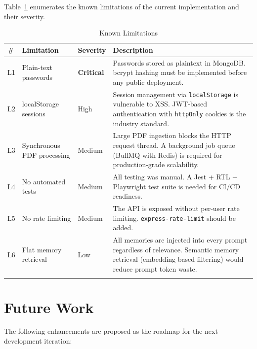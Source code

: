 \documentclass[12pt,a4paper]{report}
\begin{document}
Table~\ref{tab:limitations} enumerates the known limitations of the current implementation and their severity.

\begin{longtable}{@{}p{0.5cm} p{3.8cm} p{2cm} p{6.5cm}@{}}
\toprule
\textbf{\#} & \textbf{Limitation} & \textbf{Severity} & \textbf{Description} \\
\midrule
\endhead
L1 & Plain-text passwords & \textbf{Critical} & Passwords stored as plaintext in MongoDB. bcrypt hashing must be implemented before any public deployment. \\
L2 & localStorage sessions & High & Session management via \texttt{localStorage} is vulnerable to XSS. JWT-based authentication with \texttt{httpOnly} cookies is the industry standard. \\
L3 & Synchronous PDF processing & Medium & Large PDF ingestion blocks the HTTP request thread. A background job queue (BullMQ with Redis) is required for production-grade scalability. \\
L4 & No automated tests & Medium & All testing was manual. A Jest + RTL + Playwright test suite is needed for CI/CD readiness. \\
L5 & No rate limiting & Medium & The API is exposed without per-user rate limiting. \texttt{express-rate-limit} should be added. \\
L6 & Flat memory retrieval & Low & All memories are injected into every prompt regardless of relevance. Semantic memory retrieval (embedding-based filtering) would reduce prompt token waste. \\
\bottomrule
\caption{Known Limitations}
\label{tab:limitations}
\end{longtable}

\section{Future Work}

The following enhancements are proposed as the roadmap for the next development iteration:
\end{document}
